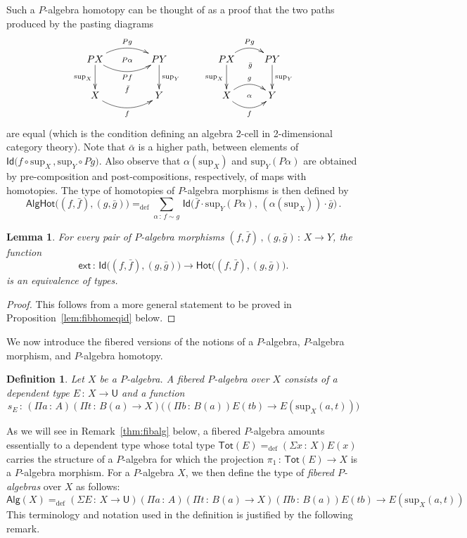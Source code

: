 \documentclass[10pt,a4paper,oneside,reqno]{amsart}
\theoremstyle{mythm}
\newtheorem{lemma}[theorem]{Lemma}
\theoremstyle{mydef}
\newtheorem{definition}[theorem]{Definition}
\theoremstyle{myrmk}
\newcommand{\defeq}{=_{\mathrm{def}}}
\newcommand{\co}{\,{:}\,}
\newcommand{\Hot}{\mathsf{Hot}}
\newcommand{\ext}{\mathsf{ext}}
\newcommand{\Id}{\mathsf{Id}}
\newcommand{\U}{\mathsf{U}}
\newcommand{\Palg}{\mathsf{Alg}}
\renewcommand{\sup}{\mathrm{sup}}
\newcommand{\AlgHot}{\mathsf{AlgHot}}
\begin{document}
Such a $P$-algebra homotopy can be thought of as a proof that the two paths produced by the pasting diagrams
\[
\xymatrix@C=1.5cm{
PX \ar@/^1pc/[r]^{Pg}   \ar[d]_{\sup_X}   \ar@/_1pc/[r]_{Pf} \ar@{}[r]|{P\alpha}
& PY \ar[d]^{\sup_Y}  \\
X  \ar@/_1pc/[r]_f  \ar@{}[r]^{\bar{f}} & Y }
\qquad
\xymatrix{
PX \ar@/^1pc/[r]^{Pg}   \ar[d]_{\sup_X} \ar@{}[r]_(.52){\bar{g}}  & PY \ar[d]^{\sup_Y}  \\
X \ar@/^1pc/[r]^g  \ar@/_1pc/[r]_f  \ar@{}[r]|{\alpha} & Y }
\]
are equal (which is the condition defining an algebra 2-cell in 2-dimensional category theory). Note that $\bar{\alpha}$ is a higher path, between elements of 
$\Id \big( f \circ \sup_X \, ,  \sup_Y \circ Pg \big)$. Also observe that $\alpha(\sup_X)$ and $\sup_Y(P \alpha)$ are obtained by pre-composition and post-compositions, respectively, of maps with homotopies.  The type of homotopies of $P$-algebra morphisms is then defined by
\[
\AlgHot \big( (f,\bar{f}), (g, \bar{g})  \big)
 \defeq  
\sum_{\alpha \co  f \sim g} \, \Id\big( \bar{f} \cdot \sup_Y(P \alpha),\, (\alpha(\sup_X))\cdot \bar{g} \big) \, .
\]




\begin{lemma}\label{IdEqHo}
For every pair of $P$-algebra morphisms $(f, \bar{f}) \, , (g, \bar{g}) \co X \to Y$,  
the function
\[
\ext \co 
\Id\big((f, \bar{f}), (g, \bar{g})\big) \to \Hot \big((f, \bar{f}), (g, \bar{g})\big).
\]
 is an equivalence of types. 
\end{lemma}

\begin{proof}
This follows from a more general statement to be proved in Proposition~\ref{lem:fibhomeqid} below.
\end{proof}


We now introduce the fibered versions of the notions of a $P$-algebra, $P$-algebra morphism, and $P$-algebra homotopy.

\begin{definition} \label{def:fibalg}
Let $X$ be a $P$-algebra. A \emph{fibered $P$-algebra} over $X$ consists of a dependent type $E \co X \to \U$
and a function 
\[
s_E \co (\Pi a \co A) (\Pi t \co B(a) \to X) \big( (\Pi b \co B(a))  E(t b)  \to E(\sup_X(a,t)) \big) 
 \] 
\end{definition}


As we will see in Remark~\ref{thm:fibalg} below, a fibered $P$-algebra amounts essentially to a dependent type whose total
type $\mathsf{Tot}(E) \defeq (\Sigma x \co X) E(x)$ carries the structure of a $P$-algebra for which the projection $\pi_1 \co \mathsf{Tot}(E) 
\to X$ is a $P$-algebra morphism.  For a $P$-algebra $X$, we then define the type of \emph{fibered $P$-algebras} over $X$ as follows:
\[
\Palg(X) \defeq (\Sigma E \co X \to \U) (\Pi a \co A) (\Pi t \co B(a) \to X) 
 (\Pi b \co B(a))  E(t b)  \to E(\sup_X(a,t))
 \]
This terminology and notation used in the definition is justified by the following remark.
\end{document}
